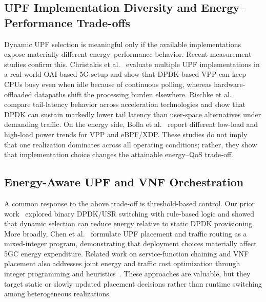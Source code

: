 \documentclass[a4paper,fleqn]{cas-sc}
\begin{document}
\subsection{UPF Implementation Diversity and Energy--Performance Trade-offs}
\label{subsec:rel_upf_impl}

Dynamic UPF selection is meaningful only if the available implementations expose materially different energy--performance behavior. Recent measurement studies confirm this. Christakis et al.~\cite{christakis2024infocom} evaluate multiple UPF implementations in a real-world OAI-based 5G setup and show that DPDK-based VPP can keep CPUs busy even when idle because of continuous polling, whereas hardware-offloaded datapaths shift the processing burden elsewhere. Rischke et al.~\cite{rischke2022nfvsdn} compare tail-latency behavior across acceleration technologies and show that DPDK can sustain markedly lower tail latency than user-space alternatives under demanding traffic. On the energy side, Bolla et al.~\cite{bolla2024greencom} report different low-load and high-load power trends for VPP and eBPF/XDP. These studies do not imply that one realization dominates across all operating conditions; rather, they show that implementation choice changes the attainable energy--QoS trade-off.

\subsection{Energy-Aware UPF and VNF Orchestration}
\label{subsec:rel_nonlearning}

A common response to the above trade-off is threshold-based control. Our prior work~\cite{BorjiDynamicEU} explored binary DPDK/USR switching with rule-based logic and showed that dynamic selection can reduce energy relative to static DPDK provisioning. More broadly, Chen et al.~\cite{chen2024comcom} formulate UPF placement and traffic routing as a mixed-integer program, demonstrating that deployment choices materially affect 5GC energy expenditure. Related work on service-function chaining and VNF placement also addresses joint energy and traffic cost optimization through integer programming and heuristics~\cite{pham2020tsc,lin2023tsc}. These approaches are valuable, but they target static or slowly updated placement decisions rather than runtime switching among heterogeneous realizations.
\end{document}
